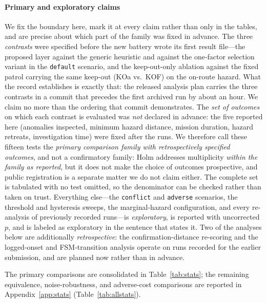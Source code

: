 \paragraph*{Primary and exploratory claims} We fix the boundary here, mark it at
every claim rather than only in the tables, and are precise about which part of the
family was fixed in advance. The three \emph{contrasts} were specified before the new
battery wrote its first result file---the proposed layer against the generic
heuristic and against the one-factor selection variant in the \texttt{default}
scenario, and the keep-out-only ablation against the fixed patrol carrying the same
keep-out (KOa vs.\ KOF) on the on-route hazard. What the record establishes is
exactly that: the released analysis plan carries the three contrasts in a commit
that precedes the first archived run by about an hour. We claim no more than the
ordering that commit demonstrates. The
\emph{set of outcomes} on which each contrast is evaluated was \emph{not} declared in
advance: the five reported here (anomalies inspected, minimum hazard distance,
mission duration, hazard retreats, investigation time) were fixed after the runs.
We therefore call these fifteen tests the \emph{primary comparison family with
retrospectively specified outcomes}, and not a confirmatory family: Holm addresses
multiplicity \emph{within the family as reported}, but it does not make the choice of
outcomes prospective, and public registration is a separate matter we do not claim
either. The complete set is tabulated with no test omitted, so the denominator can be
checked rather than taken on trust. Everything else---the \texttt{conflict} and
\texttt{adverse} scenarios, the threshold and hysteresis sweeps, the marginal-hazard
configuration, and every re-analysis of previously recorded runs---is
\emph{exploratory}, is reported with uncorrected $p$, and is labeled as exploratory
in the sentence that states it. Two of the analyses below are additionally
\emph{retrospective}: the confirmation-distance re-scoring and the logged-onset and
FSM-transition analysis operate on runs recorded for the earlier submission, and are planned now rather
than in advance.

The primary comparisons are consolidated in
Table~\ref{tab:stats}; the remaining equivalence, noise-robustness, and
adverse-cost comparisons are reported in Appendix~\ref{app:stats}
(Table~\ref{tab:allstats}).

